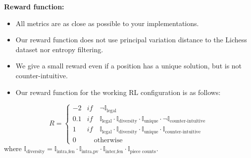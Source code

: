 \documentclass{beamer}
\begin{document}

\begin{frame}
    \textbf{Reward function:}
    \begin{itemize}
        \item All metrics are as close as possible to your implementations.
        \item Our reward function does not use principal variation distance to the Lichess dataset nor entropy filtering.
        \item We give a small reward even if a position has a unique solution, but is not counter-intuitive.
        \item Our reward function for the working RL configuration is as follows:
    \end{itemize}
    \begin{equation*}
        R = \begin{cases}
            -2 & if \quad\neg\mathbb{I}_{\text{legal}} \\
            0.1 & if \quad\mathbb{I}_{\text{legal}} \cdot \mathbb{I}_{\text{diversity}} \cdot \mathbb{I}_{\text{unique}} \cdot \neg\mathbb{I}_{\text{counter-intuitive}}\\
            1 & if \quad\mathbb{I}_{\text{legal}} \cdot \mathbb{I}_{\text{diversity}} \cdot \mathbb{I}_{\text{unique}} \cdot \mathbb{I}_{\text{counter-intuitive}}\\
            0 & \quad \text{otherwise}
        \end{cases}
    \end{equation*}
    where $\mathbb{I}_{\text{diversity}} = \mathbb{I}_{\text{intra}, \text{fen}} \cdot \mathbb{I}_{\text{intra}, \text{pv}} \cdot \mathbb{I}_{\text{inter}, \text{fen}} \cdot \mathbb{I}_{\text{piece counts}}$.
\end{frame}
\end{document}
